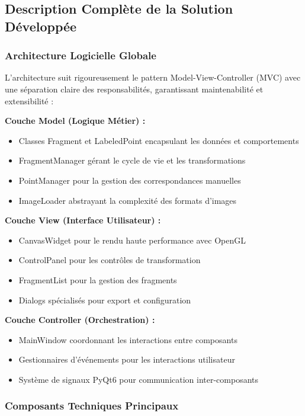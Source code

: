 \documentclass[12pt,a4paper]{article}
\begin{document}
\subsection{Description Complète de la Solution Développée}

\subsubsection{Architecture Logicielle Globale}

L'architecture suit rigoureusement le pattern Model-View-Controller (MVC) avec une séparation claire des responsabilités, garantissant maintenabilité et extensibilité :

\textbf{Couche Model (Logique Métier) :}
\begin{itemize}
\item Classes Fragment et LabeledPoint encapsulant les données et comportements
\item FragmentManager gérant le cycle de vie et les transformations
\item PointManager pour la gestion des correspondances manuelles
\item ImageLoader abstrayant la complexité des formats d'images
\end{itemize}

\textbf{Couche View (Interface Utilisateur) :}
\begin{itemize}
\item CanvasWidget pour le rendu haute performance avec OpenGL
\item ControlPanel pour les contrôles de transformation
\item FragmentList pour la gestion des fragments
\item Dialogs spécialisés pour export et configuration
\end{itemize}

\textbf{Couche Controller (Orchestration) :}
\begin{itemize}
\item MainWindow coordonnant les interactions entre composants
\item Gestionnaires d'événements pour les interactions utilisateur
\item Système de signaux PyQt6 pour communication inter-composants
\end{itemize}

\subsubsection{Composants Techniques Principaux}
\end{document}
